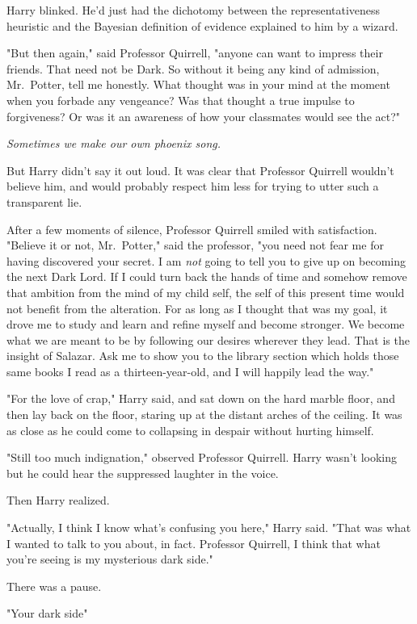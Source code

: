 Harry blinked. He'd just had the dichotomy between the representativeness
heuristic and the Bayesian definition of evidence explained to him by a wizard.

"But then again," said Professor Quirrell, "anyone can want to impress their
friends. That need not be Dark. So without it being any kind of admission,
Mr.~Potter, tell me honestly. What thought was in your mind at the moment when
you forbade any vengeance? Was that thought a true impulse to forgiveness? Or
was it an awareness of how your classmates would see the act?"

\emph{Sometimes we make our own phoenix song.}

But Harry didn't say it out loud. It was clear that Professor Quirrell wouldn't
believe him, and would probably respect him less for trying to utter such a
transparent lie.

After a few moments of silence, Professor Quirrell smiled with satisfaction.
"Believe it or not, Mr.~Potter," said the professor, "you need not fear me for
having discovered your secret. I am \emph{not} going to tell you to give up on
becoming the next Dark Lord. If I could turn back the hands of time and somehow
remove that ambition from the mind of my child self, the self of this present
time would not benefit from the alteration. For as long as I thought that was
my goal, it drove me to study and learn and refine myself and become stronger.
We become what we are meant to be by following our desires wherever they lead.
That is the insight of Salazar. Ask me to show you to the library section which
holds those same books I read as a thirteen-year-old, and I will happily lead
the way."

"For the love of crap," Harry said, and sat down on the hard marble floor, and
then lay back on the floor, staring up at the distant arches of the ceiling. It
was as close as he could come to collapsing in despair without hurting himself.

"Still too much indignation," observed Professor Quirrell. Harry wasn't looking
but he could hear the suppressed laughter in the voice.

Then Harry realized.

"Actually, I think I know what's confusing you here," Harry said. "That was
what I wanted to talk to you about, in fact. Professor Quirrell, I think that
what you're seeing is my mysterious dark side."

There was a pause.

"Your{\el} dark side{\el}"

